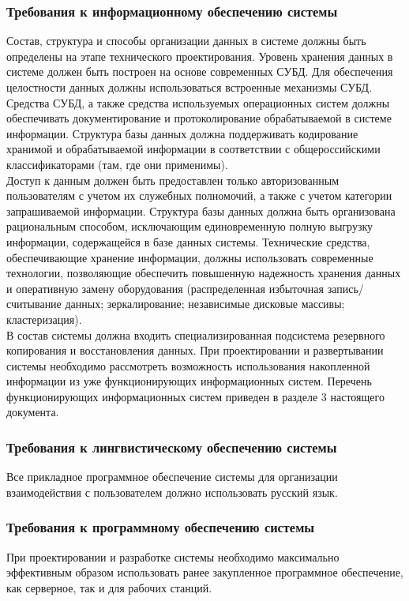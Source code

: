 \documentclass[russian, utf8, 12pt,pointsubsection,floatsubsection]{eskdtext}
\begin{document}
\subsubsection{Требования к информационному обеспечению системы}
Состав, структура и способы организации данных в системе должны быть определены на этапе технического проектирования. Уровень хранения данных в системе должен быть построен на основе современных СУБД. Для обеспечения целостности данных должны использоваться встроенные механизмы СУБД. Средства СУБД, а также средства используемых операционных систем должны обеспечивать документирование и протоколирование обрабатываемой в системе информации. Структура базы данных должна поддерживать кодирование хранимой и обрабатываемой информации в соответствии с общероссийскими классификаторами (там, где они применимы).\\

Доступ к данным должен быть предоставлен только авторизованным пользователям с учетом их служебных полномочий, а также с учетом категории запрашиваемой информации. Структура базы данных должна быть организована рациональным способом, исключающим единовременную полную выгрузку информации, содержащейся в базе данных системы. Технические средства, обеспечивающие хранение информации, должны использовать современные технологии, позволяющие обеспечить повышенную надежность хранения данных и оперативную замену оборудования (распределенная избыточная запись/считывание данных; зеркалирование; независимые дисковые массивы; кластеризация).\\

В состав системы должна входить специализированная подсистема резервного копирования и восстановления данных. При проектировании и развертывании системы необходимо рассмотреть возможность использования накопленной информации из уже функционирующих информационных систем. Перечень функционирующих информационных систем приведен в разделе 3 настоящего документа.

\subsubsection{Требования к лингвистическому обеспечению системы}
Все прикладное программное обеспечение системы для организации взаимодействия с пользователем должно использовать русский язык.

\subsubsection{Требования к программному обеспечению системы}
При проектировании и разработке системы необходимо максимально эффективным образом использовать ранее закупленное программное обеспечение, как серверное, так и для рабочих станций.
\end{document}
